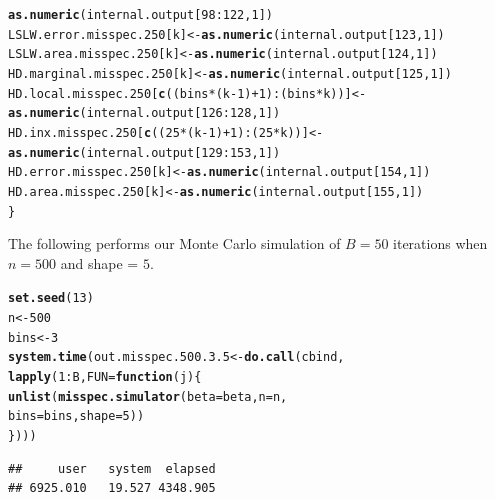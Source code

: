 \documentclass[11pt]{article}\usepackage[]{graphicx}\usepackage[]{color}
\makeatletter
\newcommand{\hlnum}[1]{\textcolor[rgb]{0.686,0.059,0.569}{#1}}%
\newcommand{\hlopt}[1]{\textcolor[rgb]{0,0,0}{#1}}%
\newcommand{\hlstd}[1]{\textcolor[rgb]{0.345,0.345,0.345}{#1}}%
\newcommand{\hlkwa}[1]{\textcolor[rgb]{0.161,0.373,0.58}{\textbf{#1}}}%
\newcommand{\hlkwb}[1]{\textcolor[rgb]{0.69,0.353,0.396}{#1}}%
\newcommand{\hlkwc}[1]{\textcolor[rgb]{0.333,0.667,0.333}{#1}}%
\newcommand{\hlkwd}[1]{\textcolor[rgb]{0.737,0.353,0.396}{\textbf{#1}}}%
\newenvironment{kframe}{%
 \def\at@end@of@kframe{}%
 \ifinner\ifhmode%
  \def\at@end@of@kframe{\end{minipage}}%
  \begin{minipage}{\columnwidth}%
 \fi\fi%
 \def\FrameCommand##1{\hskip\@totalleftmargin \hskip-\fboxsep
 \colorbox{shadecolor}{##1}\hskip-\fboxsep
     \hskip-\linewidth \hskip-\@totalleftmargin \hskip\columnwidth}%
 \MakeFramed {\advance\hsize-\width
   \@totalleftmargin\z@ \linewidth\hsize
   \@setminipage}}%
 {\par\unskip\endMakeFramed%
 \at@end@of@kframe}
\newenvironment{knitrout}{}{} %
\makeatother
\begin{document}
\begin{knitrout}
\begin{kframe}
\begin{alltt}
    \hlkwd{as.numeric}\hlstd{(internal.output[}\hlnum{98}\hlopt{:}\hlnum{122}\hlstd{,} \hlnum{1}\hlstd{])}
  \hlstd{LSLW.error.misspec.250[k]} \hlkwb{<-} \hlkwd{as.numeric}\hlstd{(internal.output[}\hlnum{123}\hlstd{,} \hlnum{1}\hlstd{])}
  \hlstd{LSLW.area.misspec.250[k]} \hlkwb{<-} \hlkwd{as.numeric}\hlstd{(internal.output[}\hlnum{124}\hlstd{,} \hlnum{1}\hlstd{])}
  \hlstd{HD.marginal.misspec.250[k]} \hlkwb{<-} \hlkwd{as.numeric}\hlstd{(internal.output[}\hlnum{125}\hlstd{,} \hlnum{1}\hlstd{])}
  \hlstd{HD.local.misspec.250[}\hlkwd{c}\hlstd{((bins}\hlopt{*}\hlstd{(k}\hlopt{-}\hlnum{1}\hlstd{)}\hlopt{+}\hlnum{1}\hlstd{)}\hlopt{:}\hlstd{(bins}\hlopt{*}\hlstd{k))]} \hlkwb{<-}
    \hlkwd{as.numeric}\hlstd{(internal.output[}\hlnum{126}\hlopt{:}\hlnum{128}\hlstd{,} \hlnum{1}\hlstd{])}
  \hlstd{HD.inx.misspec.250[}\hlkwd{c}\hlstd{((}\hlnum{25}\hlopt{*}\hlstd{(k}\hlopt{-}\hlnum{1}\hlstd{)}\hlopt{+}\hlnum{1}\hlstd{)}\hlopt{:}\hlstd{(}\hlnum{25}\hlopt{*}\hlstd{k))]} \hlkwb{<-}
    \hlkwd{as.numeric}\hlstd{(internal.output[}\hlnum{129}\hlopt{:}\hlnum{153}\hlstd{,} \hlnum{1}\hlstd{])}
  \hlstd{HD.error.misspec.250[k]} \hlkwb{<-} \hlkwd{as.numeric}\hlstd{(internal.output[}\hlnum{154}\hlstd{,} \hlnum{1}\hlstd{])}
  \hlstd{HD.area.misspec.250[k]} \hlkwb{<-} \hlkwd{as.numeric}\hlstd{(internal.output[}\hlnum{155}\hlstd{,} \hlnum{1}\hlstd{])}
\hlstd{\}}
\end{alltt}
\end{kframe}
\end{knitrout}


The following performs our Monte Carlo simulation of $B = 50$ iterations 
when $n = 500$ and shape = $5$. 

\begin{knitrout}
\color{fgcolor}\begin{kframe}
\begin{alltt}
\hlkwd{set.seed}\hlstd{(}\hlnum{13}\hlstd{)}
\hlstd{n} \hlkwb{<-} \hlnum{500}
\hlstd{bins} \hlkwb{<-} \hlnum{3}
\hlkwd{system.time}\hlstd{(out.misspec.500.3.5} \hlkwb{<-} \hlkwd{do.call}\hlstd{(cbind,}
  \hlkwd{lapply}\hlstd{(}\hlnum{1}\hlopt{:}\hlstd{B,} \hlkwc{FUN} \hlstd{=} \hlkwa{function}\hlstd{(}\hlkwc{j}\hlstd{)\{}
    \hlkwd{unlist}\hlstd{(}\hlkwd{misspec.simulator}\hlstd{(}\hlkwc{beta} \hlstd{= beta,} \hlkwc{n} \hlstd{= n,}
      \hlkwc{bins} \hlstd{= bins,} \hlkwc{shape} \hlstd{=} \hlnum{5}\hlstd{))}
\hlstd{\})))}
\end{alltt}
\begin{verbatim}
##     user   system  elapsed 
## 6925.010   19.527 4348.905
\end{verbatim}
\end{kframe}
\end{knitrout}
\end{document}
